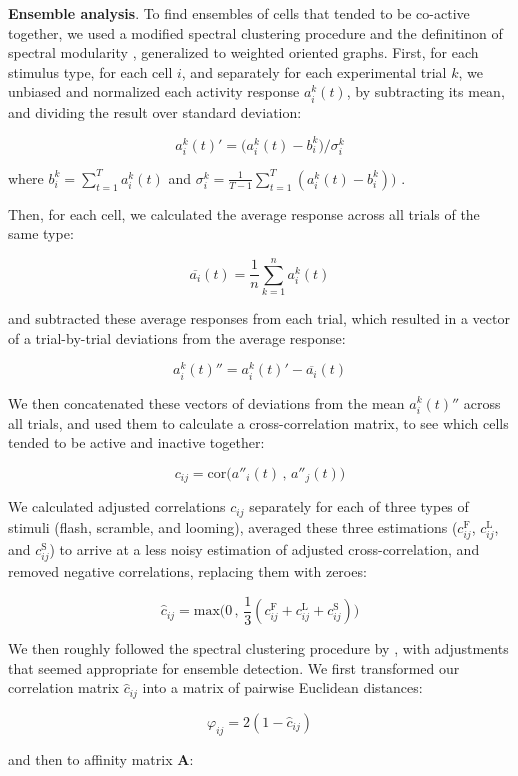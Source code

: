 \documentclass{article}
\begin{document}
\textbf{Ensemble analysis}. To find ensembles of cells that tended to be co-active together, we used a modified spectral clustering procedure \citep{ng2002spectral} and the definitinon of spectral modularity \citep{newman2006modularity}, generalized to weighted oriented graphs. First, for each stimulus type, for each cell $i$, and separately for each experimental trial $k$, we unbiased and normalized each activity response $a^k_i(t)$, by subtracting its mean, and dividing the result over standard deviation:

\[ a^k_i(t)' = \big(a^k_i(t)-b^k_i\big)/\sigma^k_i \]

where $b^k_i = \sum_{t=1}^T{a^k_i(t)}$ and $\sigma^k_i = \frac{1}{T-1}\sum_{t=1}^T{(a^k_i(t) - b^k_i))}$ .

Then, for each cell, we calculated the average response across all trials of the same type: 

\[ \overline{a_i}(t) = \frac{1}{n}\sum_{k=1}^n{a^k_i(t)} \]

and subtracted these average responses from each trial, which resulted in a vector of a trial-by-trial deviations from the average response:

\[ a^k_i(t)'' = a^k_i(t)' - \overline{a_i}(t) \]

We then concatenated these vectors of deviations from the mean $a^k_i(t)''$ across all trials, and used them to calculate a cross-correlation matrix, to see which cells tended to be active and inactive together:

\[ c_{ij} = \text{cor}\big(a''_i(t)\, , \, a''_j(t)\big) \]

We calculated adjusted correlations $c_{ij}$ separately for each of three types of stimuli (flash, scramble, and looming), averaged these three estimations ($c_{ij}^\text{F}$, $c_{ij}^\text{L}$, and $c_{ij}^\text{S}$) to arrive at a less noisy estimation of adjusted cross-correlation, and removed negative correlations, replacing them with zeroes:

\[ \hat{c}_{ij} = \text{max}\big(0 \, , \, \frac{1}{3} (c_{ij}^\text{F} + c_{ij}^\text{L} + c_{ij}^\text{S})\big) \]

We then roughly followed the spectral clustering procedure by \citep{ng2002spectral}, with adjustments that seemed appropriate for ensemble detection. We first transformed our correlation matrix $\hat{c}_{ij}$ into a matrix of pairwise Euclidean distances:

\[ \varphi_{ij} = 2(1-\hat{c}_{ij}) \]

and then to affinity matrix $\mathbf{A}$:
\end{document}
